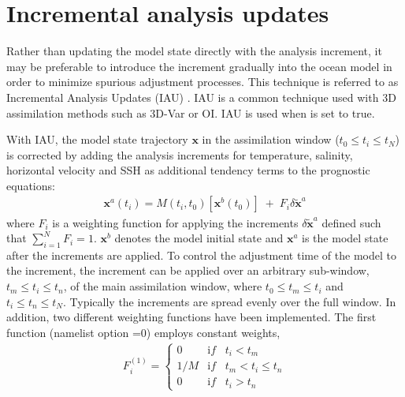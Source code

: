 \documentclass[../main/NEMO_manual]{subfiles}
\begin{document}
\section{Incremental analysis updates}
\label{sec:ASM_IAU}

Rather than updating the model state directly with the analysis increment,
it may be preferable to introduce the increment gradually into the ocean model in order to
minimize spurious adjustment processes.
This technique is referred to as Incremental Analysis Updates (IAU) \citep{bloom.takacs.ea_MWR96}.
IAU is a common technique used with 3D assimilation methods such as 3D-Var or OI.
IAU is used when  is set to true.

With IAU, the model state trajectory ${\mathbf x}$ in the assimilation window ($t_{0} \leq t_{i} \leq t_{N}$)
is corrected by adding the analysis increments for temperature, salinity, horizontal velocity and SSH as
additional tendency terms to the prognostic equations:
\begin{align*}
  {\mathbf x}^{a}(t_{i}) = M(t_{i}, t_{0})[{\mathbf x}^{b}(t_{0})] \; + \; F_{i} \delta \tilde{\mathbf x}^{a}
\end{align*}
where $F_{i}$ is a weighting function for applying the increments $\delta\tilde{\mathbf x}^{a}$ defined such that
$\sum_{i=1}^{N} F_{i}=1$.
${\mathbf x}^b$ denotes the model initial state and ${\mathbf x}^a$ is the model state after the increments are applied.
To control the adjustment time of the model to the increment,
the increment can be applied over an arbitrary sub-window, $t_{m} \leq t_{i} \leq t_{n}$,
of the main assimilation window, where $t_{0} \leq t_{m} \leq t_{i}$ and $t_{i} \leq t_{n} \leq t_{N}$.
Typically the increments are spread evenly over the full window.
In addition, two different weighting functions have been implemented.
The first function (namelist option =0) employs constant weights,
\begin{align}
  \label{eq:ASM_F1_i}
  F^{(1)}_{i}
  =\left\{
  \begin{array}{ll}
    0     &    {\mathrm if} \; \; \; t_{i} < t_{m}                \\
    1/M &    {\mathrm if} \; \; \; t_{m} < t_{i} \leq t_{n} \\
    0     &    {\mathrm if} \; \; \; t_{i} > t_{n}
  \end{array}
            \right.
\end{align}
\end{document}
